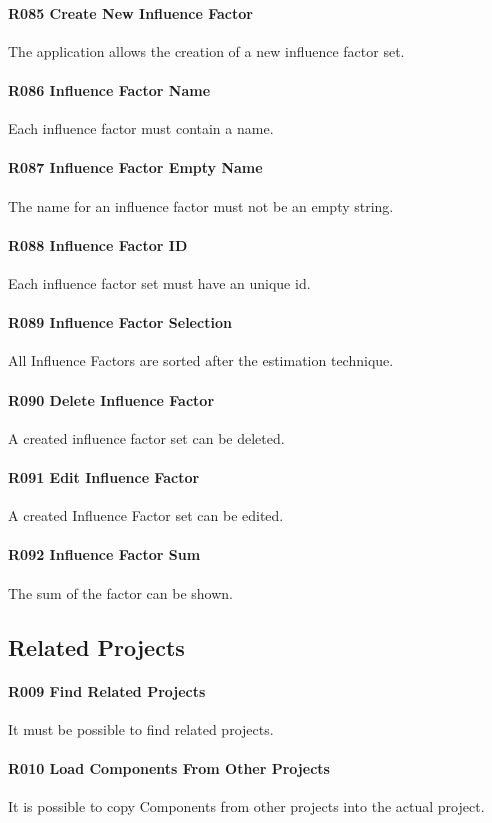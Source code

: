 \paragraph{R085 Create New Influence Factor}
The application allows the creation of a new influence factor set.
\paragraph{R086 Influence Factor Name}
Each influence factor must contain a name.
\paragraph{R087 Influence Factor Empty Name}
The name for an influence factor must not be an empty string.
\paragraph{R088 Influence Factor ID}
Each influence factor set must have an unique id.
\paragraph{R089 Influence Factor Selection}
All Influence Factors are sorted after the estimation technique.
\paragraph{R090 Delete Influence Factor}
A created influence factor set can be deleted.
\paragraph{R091 Edit Influence Factor}
A created Influence Factor set can be edited.
\paragraph{R092 Influence Factor Sum}
The sum of the factor can be shown.

\subsection{Related Projects}
\paragraph{R009 Find Related Projects}
It must be possible to find related projects.
\paragraph{R010 Load Components From Other Projects}
It is possible to copy Components from other projects into the actual project.
